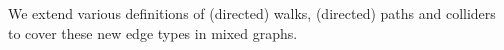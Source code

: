 We extend various definitions of (directed) walks, (directed) paths and colliders to cover these new edge types in mixed graphs.
